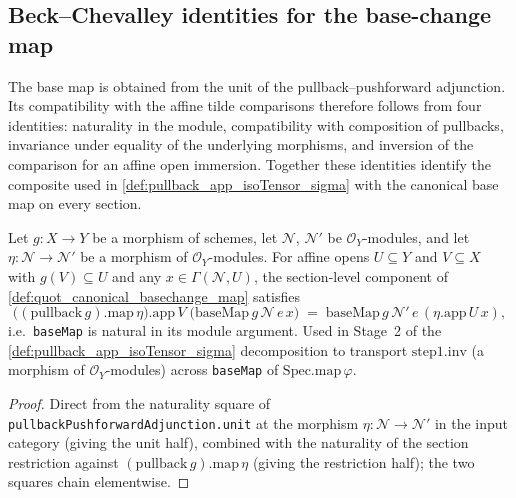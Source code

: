 \subsection{Beck--Chevalley identities for the base-change map}
\label{sec:quot_iter195_bc_substrate}

The base map is obtained from the unit of the pullback--pushforward
adjunction. Its compatibility with the affine tilde comparisons therefore
follows from four identities: naturality in the module, compatibility with
composition of pullbacks, invariance under equality of the underlying
morphisms, and inversion of the comparison for an affine open immersion.
Together these identities identify the composite used in
\cref{def:pullback_app_isoTensor_sigma} with the canonical base map on every
section.

\begin{lemma}
  \label{lem:baseMap_pullbackComp_apply}
  \leanok
  Let \(g : X \to Y\) be a morphism of schemes, let \(\mathcal N\),
  \(\mathcal N'\) be \(\mathcal O_Y\)-modules, and let
  \(\eta : \mathcal N \to \mathcal N'\) be a morphism of
  \(\mathcal O_Y\)-modules. For affine opens \(U \subseteq Y\) and
  \(V \subseteq X\) with \(g(V) \subseteq U\) and any
  \(x \in \Gamma(\mathcal N, U)\), the section-level component of
  \cref{def:quot_canonical_basechange_map} satisfies
  \[
    \bigl((\text{pullback}\,g).\mathrm{map}\,\eta\bigr).\mathrm{app}\,V\;
    \bigl(\text{baseMap}\,g\,\mathcal N\,e\,x\bigr)
    \;=\;
    \text{baseMap}\,g\,\mathcal N'\,e\,(\eta.\mathrm{app}\,U\,x),
  \]
  i.e.\ \texttt{baseMap} is natural in its module argument. Used in
  Stage~2 of the \cref{def:pullback_app_isoTensor_sigma}
  decomposition to transport \(\text{step1}.\mathrm{inv}\) (a
  morphism of \(\mathcal O_Y\)-modules) across \texttt{baseMap} of
  \(\text{Spec.map}\,\varphi\).
\end{lemma}
\begin{proof}
  \leanok
  Direct from the naturality square of
  \texttt{pullbackPushforwardAdjunction.unit} at the morphism
  \(\eta : \mathcal N \to \mathcal N'\) in the input category
  (giving the unit half), combined with the naturality of the
  section restriction against \((\text{pullback}\,g).\mathrm{map}\,\eta\)
  (giving the restriction half); the two squares chain elementwise.
\end{proof}

